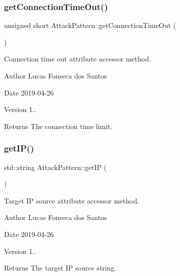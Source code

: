 \subsubsection{\texorpdfstring{get\+Connection\+Time\+Out()}{getConnectionTimeOut()}}
{\footnotesize\ttfamily unsigned short Attack\+Pattern\+::get\+Connection\+Time\+Out (\begin{DoxyParamCaption}{ }\end{DoxyParamCaption})}

Connection time out attribute accessor method. \begin{DoxyAuthor}{Author}
Lucas Fonseca dos Santos 
\end{DoxyAuthor}
\begin{DoxyDate}{Date}
2019-\/04-\/26 
\end{DoxyDate}
\begin{DoxyVersion}{Version}
1..
\end{DoxyVersion}
\begin{DoxyReturn}{Returns}
The connection time limit. 
\end{DoxyReturn}
\mbox{\label{classAttackPattern_ab693660f874bdb5951c9480ec790f1ad}} 
\subsubsection{\texorpdfstring{get\+I\+P()}{getIP()}}
{\footnotesize\ttfamily std\+::string Attack\+Pattern\+::get\+IP (\begin{DoxyParamCaption}{ }\end{DoxyParamCaption})}

Target IP source attribute accessor method. \begin{DoxyAuthor}{Author}
Lucas Fonseca dos Santos 
\end{DoxyAuthor}
\begin{DoxyDate}{Date}
2019-\/04-\/26 
\end{DoxyDate}
\begin{DoxyVersion}{Version}
1..
\end{DoxyVersion}
\begin{DoxyReturn}{Returns}
The target IP source string. 
\end{DoxyReturn}
\mbox{\label{classAttackPattern_a94060d1c3243cdf8b2db2d1bb6bec1a9}} 
